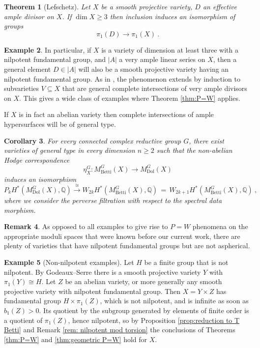 \documentclass[11pt, a4paper]{amsart}
\newtheorem{theorem}{Theorem}[section]
\newtheorem{corollary}[theorem]{Corollary}
\theoremstyle{definition}
\newtheorem{example}[theorem]{Example}
\newtheorem{remark}[theorem]{Remark}
\theoremstyle{myitemstyle}
\newcommand{\Q}{\mathbb{Q}}
\newcommand{\Dol}{{\mathrm{Dol}}}
\newcommand{\Betti}{{\mathrm{Betti}}}
\begin{document}
\begin{theorem}[Lefschetz]\label{thm:Lefschetz}
Let $X$ be a smooth projective variety, $D$ an effective ample divisor on $X$. If $\dim X\geq 3$ then  inclusion induces an isomorphism of groups 
\[
\pi_1(D) \to \pi_1(X)\ . 
\]
\end{theorem}

\begin{example}\label{eg:subvarieties of general type}
 In particular, if $X$ is a variety of dimension at least three with a nilpotent fundamental group, and $|A|$ a very ample linear series on $X$, then a general element $D\in |A|$ will also be a smooth projective variety having  an nilpotent fundamental group.  As in \cite[Example 3.1.31]{PAG_I},  the phenomenon extends by induction to subvarieties  $V\subseteq X$ that are general complete intersections of very ample divisors on $X$.  This gives a wide class of examples where Theorem \ref{thm:P=W} applies. 

If $X$ is in fact an abelian variety then complete intersections of ample hypersurfaces will be of general type. 
\end{example}

\begin{corollary}\label{cor:general type}
   For every connected complex reductive group $G$, there exist varieties of general type   in every dimension $n\geq 2$ such that 
   the  non-abelian Hodge correspondence 
\[
    \eta_X^G\colon M^G_\Betti(X)\to M^G_\Dol(X)
\]
induces an isomorphism
\[
    P_k H^*(M^G_\Dol(X),\Q) \xrightarrow{\cong}
    W_{2k} H^*(M^G_\Betti(X),\Q) \,=\,
    W_{2k+1} H^*(M^G_\Betti(X),\Q)\ ,
\]
where we consider  the perverse filtration  with respect to the spectral data morphism.
\end{corollary}
 
\begin{remark}
As opposed to all examples  to give rise to $P=W$ phenomena on the appropriate moduli spaces that were known before our current work, there are plenty of varieties that have nilpotent fundamental groups but are not aspherical. 
\end{remark}


\begin{example}[Non-nilpotent examples]\label{ex:non-nilpotent}
Let $H$ be a finite group that is not nilpotent. By Godeaux--Serre there is a smooth projective variety $Y$ with $\pi_1(Y)\cong H$. Let $Z$ be an abelian variety, or more generally any smooth projective variety with nilpotent fundamental group. Then $X=Y\times Z$ has fundamental group $H\times\pi_1(Z)$, which is not nilpotent, and is infinite as soon as $b_1(Z)>0$. Its quotient by the subgroup generated by elements of finite order is a quotient of $\pi_1(Z)$, hence nilpotent, so by Proposition \ref{prop:reduction to T Betti} and Remark \ref{rem: nilpotent mod torsion} the conclusions of Theorems \ref{thm:P=W} and \ref{thm:geometric P=W} hold for $X$.
\end{example}
\end{document}
